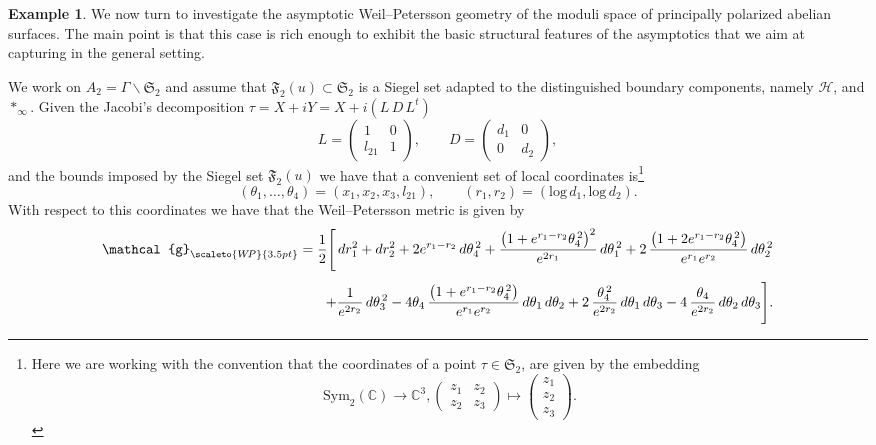 \documentclass[11pt]{amsart}
\theoremstyle{plain}
\theoremstyle{definition}
\newtheorem{example}[theorem]{Example}
\theoremstyle{remark}
\newcommand{\C}{{\mathbb C}}
\newcommand{\fS}{\mathfrak{S}}
\renewcommand{\log}{\mathrm{log}}
\newcommand{\g}{\mathcal{g}}
\newcommand{\cH}{\mathcal{H}}
\newcommand{\fF}{\mathfrak{F}}
\begin{document}
\begin{example}
\label{ex:wpabsurf}
We now turn to investigate the asymptotic Weil--Petersson geometry of the moduli space of principally polarized abelian surfaces. The main point is that this case is rich enough to exhibit the basic structural features of the asymptotics that we aim at capturing in the general setting.

We work on $A_2=\Gamma\backslash\fS_2$ and assume that $\fF_2(u)\subset\fS_2$ is a Siegel set adapted to the distinguished boundary components, namely $\cH$, and $*_\infty$. Given the Jacobi's decomposition $\tau=X +i Y = X + i (L\,D\,L^t)$
\begin{equation}
    L=\begin{pmatrix}
        1&0\\
        l_{21}&1
    \end{pmatrix},\qquad 
    D=\begin{pmatrix}
        d_1&0\\
        0&d_2
    \end{pmatrix},
\end{equation}
and the bounds imposed by the Siegel set $\fF_2(u)$ we have that a convenient set of local coordinates is\footnote{Here we are working with the convention that the coordinates of a point $\tau \in \fS_2$, are given by the embedding
\[\mathrm{Sym}_2(\C)\to \C^3, 
    \begin{pmatrix}
        z_1&z_2  \\
        z_2&z_3 
    \end{pmatrix} \mapsto 
    \begin{pmatrix}
        z_1\\
        z_2\\
        z_3 
    \end{pmatrix}. 
\]}
\begin{equation}
    (\theta_1,\dots,\theta_4)=(x_1,x_2,x_3,l_{21}),\qquad (r_1,r_2)=(\log\,d_1,\log\,d_2).
\end{equation}
With respect to this coordinates we have that the Weil--Petersson metric is given by 
\begin{equation*}
    \begin{aligned}
        \g_{\scaleto{W\!P}{3.5pt}}
        =\frac12\Bigg[
        \,dr_1^2+dr_2^2+2e^{r_1-r_2}\,d\theta_4^{\,2}
        +\frac{\bigl(1+e^{r_1-r_2}\theta_4^{\,2}\bigr)^2}{e^{2r_1}}\,d\theta_1^{\,2}
        +2\,\frac{\bigl(1+2e^{r_1-r_2}\theta_4^{\,2}\bigr)}{e^{r_1}e^{r_2}}\,d\theta_2^{\,2}
        \\[4pt]
        \quad
        +\frac{1}{e^{2r_2}}\,d\theta_3^{\,2}
        -4\theta_4\,\frac{\bigl(1+e^{r_1-r_2}\theta_4^{\,2}\bigr)}{e^{r_1}e^{r_2}}\,d\theta_1\,d\theta_2
        +2\,\frac{\theta_4^{\,2}}{e^{2r_2}}\,d\theta_1\,d\theta_3
        -4\,\frac{\theta_4}{e^{2r_2}}\,d\theta_2\,d\theta_3
        \Bigg].
    \end{aligned}
\end{equation*}


\end{example}
\end{document}
